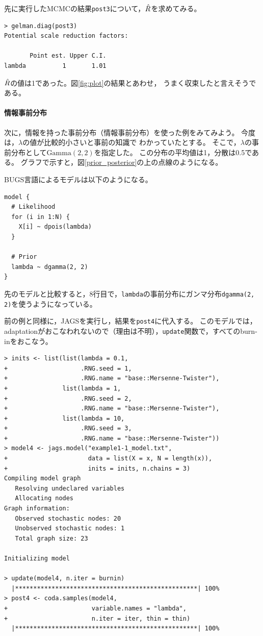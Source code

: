 \documentclass[11pt,uplatex]{jsarticle}
\begin{document}
先に実行したMCMCの結果\texttt{post3}について，$\Hat{R}$を求めてみる。
\begin{lstlisting}
> gelman.diag(post3)
Potential scale reduction factors:

       Point est. Upper C.I.
lambda          1       1.01

\end{lstlisting}
$\Hat{R}$の値は1であった。図\ref{fig:plot}の結果とあわせ，
うまく収束したと言えそうである。

\paragraph{情報事前分布}

次に，情報を持った事前分布（情報事前分布）を使った例をみてみよう。
今度は，$\lambda$の値が比較的小さいと事前の知識で
わかっていたとする。
そこで，$\lambda$の事前分布として$\mathrm{Gamma}(2, 2)$を指定した。
この分布の平均値は1，分散は0.5である。
グラフで示すと，図\ref{prior_posterior}の上の点線のようになる。

\textsf{BUGS}言語によるモデルは以下のようになる。
\begin{lstlisting}
model {
  # Likelihood
  for (i in 1:N) {
    X[i] ~ dpois(lambda)
  }

  # Prior
  lambda ~ dgamma(2, 2)
}
\end{lstlisting}
先のモデルと比較すると，8行目で，\texttt{lambda}の事前分布にガンマ分布\texttt{dgamma(2, 2)}を使うようになっている。

前の例と同様に，\textsf{JAGS}を実行し，結果を\texttt{post4}に代入する。
このモデルでは，adaptationがおこなわれないので（理由は不明），\texttt{update}関数で，すべてのburn-inをおこなう。
%
\begin{lstlisting}
> inits <- list(list(lambda = 0.1,
+                    .RNG.seed = 1,
+                    .RNG.name = "base::Mersenne-Twister"),
+               list(lambda = 1,
+                    .RNG.seed = 2,
+                    .RNG.name = "base::Mersenne-Twister"),
+               list(lambda = 10,
+                    .RNG.seed = 3,
+                    .RNG.name = "base::Mersenne-Twister"))
> model4 <- jags.model("example1-1_model.txt",
+                      data = list(X = x, N = length(x)),
+                      inits = inits, n.chains = 3)
Compiling model graph
   Resolving undeclared variables
   Allocating nodes
Graph information:
   Observed stochastic nodes: 20
   Unobserved stochastic nodes: 1
   Total graph size: 23

Initializing model

> update(model4, n.iter = burnin)
  |**************************************************| 100%
> post4 <- coda.samples(model4,
+                       variable.names = "lambda",
+                       n.iter = iter, thin = thin)
  |**************************************************| 100%
\end{lstlisting}
\end{document}
